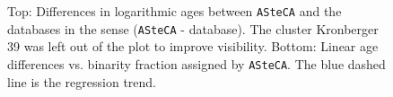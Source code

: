 \documentclass{aa}
\begin{document}
  \begin{figure}
   \caption{Top: Differences in logarithmic ages between \texttt{ASteCA} and
   the databases in the sense (\texttt{ASteCA} - database). The cluster
   Kronberger 39 was left out of the plot to improve visibility.
   Bottom: Linear age differences vs. binarity fraction assigned by
   \texttt{ASteCA}. The blue dashed line is the regression trend.}
   \label{fig:ages}
  \end{figure}

\end{document}
